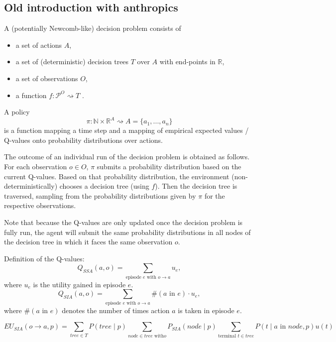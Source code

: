 \documentclass{article}
\begin{document}
\subsection*{Old introduction with anthropics}

A (potentially Newcomb-like) decision problem consists of
\begin{itemize}
\item a set of actions $A$,
\item a set of (deterministic) decision trees $T$ over $A$ with end-points in $\mathbb{R}$,
\item a set of observations $O$,
\item a function $f:\mathcal{P}^O \rightsquigarrow T$ .
\end{itemize}
A policy
\begin{equation}
\pi:\mathbb{N}\times \mathbb{R}^A \rightsquigarrow A=\{a_1,...,a_n\}
\end{equation}
is a function mapping a time step and a mapping of empirical expected values / Q-values onto probability distributions over actions.

The outcome of an individual run of the decision problem is obtained as follows. For each observation $o\in O$, $\pi$ submits a probability distribution based on the current Q-values. Based on that probability distribution, the environment (non-deterministically) chooses a decision tree (using $f$). Then the decision tree is traversed, sampling from the probability distributions given by $\pi$ for the respective observations.

Note that because the Q-values are only updated once the decision problem is fully run, the agent will submit the same probability distributions in all nodes of the decision tree in which it faces the same observation $o$.

Definition of the Q-values:
\begin{equation}
Q_{SSA}(a,o) = \sum_{\text{episode }e\text{ with }o\rightarrow a} u_e,
\end{equation} where $u_e$ is the utility gained in episode $e$.
\begin{equation}Q_{SIA} (a,o) = \sum_{\text{episode }e\text{ with }o\rightarrow a} \#(a\text{ in }e) \cdot u_e,\end{equation}
where $\#(a\text{ in }e)$ denotes the number of times action $a$ is taken in episode $e$.

\begin{equation}
EU_{SIA}(o\rightarrow a,p)=\sum_{tree\in T} P(tree\mid p) \sum_{node\in tree\text{ with} o} P_{SIA}(node \mid p) \sum_{\text{terminal }t\in tree} P(t \mid a\text{ in }node, p) u(t)
\end{equation}
\end{document}
